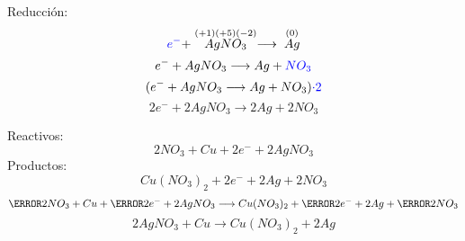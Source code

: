 \documentclass[../Práctica.root.tex]{subfiles}
\newcommand{\lra}{\ensuremath{\longrightarrow{}}}
\newcommand{\sr}[2]{\stackrel{#1}{#2}}
\begin{document}
\begin{enumerate}
\begin{enumerate}
\begin{multicols}{2}
                        \columnbreak

                        Reducción:
                        \[ \blue{e^-} + \sr{(+1)(+5)(-2)}{AgNO_3} \lra \sr{(0)}{Ag} \]
                        \[ e^- + AgNO_3 \lra Ag + \blue{NO_3} \]
                        \[ (e^- + AgNO_3 \lra Ag + NO_3)\blue{\cdot 2} \]
                        \[ 2 e^- + 2 AgNO_3 \lra 2 Ag + 2 NO_3 \]
                    \end{multicols}


                    Reactivos:
                    \[ 2 NO_3 + Cu + 2 e^- + 2 AgNO_3 \]
                    Productos:
                    \[ Cu(NO_3)_2 + 2 e^- + 2 Ag + 2 NO_3 \]
                    \[ \cancel{2 NO_3} + Cu + \cancel{2 e^-} + 2 AgNO_3 \lra Cu(NO_3)_2 + \cancel{2 e^-} + 2 Ag + \cancel{2 NO_3} \]
                    \[ 2 AgNO_3 + Cu \lra Cu(NO_3)_2 + 2 Ag \]
          \end{enumerate}
\end{enumerate}
\end{document}
